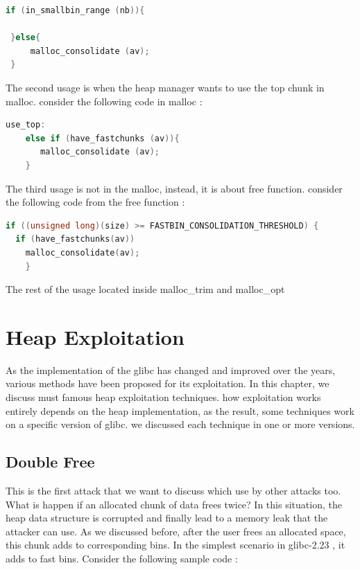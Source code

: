 \documentclass{masterthesis}
\newcommand*\libc{glibc}
\newcommand*\fb{fast bins}
\begin{document}
\begin{lstlisting}[language=c,frame=tlrb]
 if (in_smallbin_range (nb)){
 	 
 }else{
	 malloc_consolidate (av);
 }
\end{lstlisting}

The second usage is when the heap manager wants to use the top chunk in malloc. consider the following code in malloc :

\begin{lstlisting}[language=c,frame=tlrb]
use_top:
	else if (have_fastchunks (av)){
	   malloc_consolidate (av);
	}
\end{lstlisting}

The third usage is not in the malloc, instead, it is about free function. consider the following code from the free function :

\begin{lstlisting}[language=c,frame=tlrb]
if ((unsigned long)(size) >= FASTBIN_CONSOLIDATION_THRESHOLD) {
  if (have_fastchunks(av))
	malloc_consolidate(av);
	}
\end{lstlisting}

The rest of the usage located inside malloc\_trim and malloc\_opt

\chapter{Heap Exploitation }

As the implementation of the \libc{} has changed and improved over the years, various methods have been proposed for its exploitation. In this chapter, we discuss must famous heap exploitation techniques. how exploitation works entirely depends on the heap implementation, as the result, some techniques work on a specific version of \libc{}. we discussed each technique in one or more versions.

\section{Double Free}
This is the first attack that we want to discuss which use by other attacks too. What is happen if an allocated chunk of data frees twice? In this situation, the heap data structure is corrupted and finally lead to a memory leak that the attacker can use. As we discussed before, after the user frees an allocated space, this chunk adds to corresponding bins. In the simplest scenario in \libc{-2.23} , it adds to \fb{}. Consider the following sample code :
\end{document}
